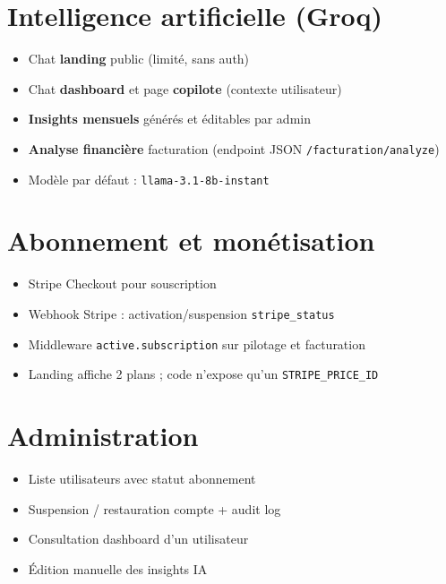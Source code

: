 \documentclass[11pt,a4paper]{report}
\begin{document}
\section{Intelligence artificielle (Groq)}

\begin{itemize}[leftmargin=1.5em]
    \item Chat \textbf{landing} public (limité, sans auth)
    \item Chat \textbf{dashboard} et page \textbf{copilote} (contexte utilisateur)
    \item \textbf{Insights mensuels} générés et éditables par admin
    \item \textbf{Analyse financière} facturation (endpoint JSON \texttt{/facturation/analyze})
    \item Modèle par défaut : \texttt{llama-3.1-8b-instant}
\end{itemize}

\section{Abonnement et monétisation}

\begin{itemize}[leftmargin=1.5em]
    \item Stripe Checkout pour souscription
    \item Webhook Stripe : activation/suspension \texttt{stripe\_status}
    \item Middleware \texttt{active.subscription} sur pilotage et facturation
    \item Landing affiche 2 plans ; code n'expose qu'un \texttt{STRIPE\_PRICE\_ID}
\end{itemize}

\section{Administration}

\begin{itemize}[leftmargin=1.5em]
    \item Liste utilisateurs avec statut abonnement
    \item Suspension / restauration compte + audit log
    \item Consultation dashboard d'un utilisateur
    \item Édition manuelle des insights IA
\end{itemize}

\end{document}
